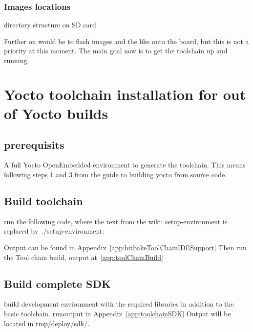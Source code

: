 \documentclass[10pt]{article}
\begin{document}
\subsubsection{Images locations}
directory structure on SD card


Further on would be to flash images and the like onto the board, but this is not a priority at this moment.
The main goal now is to get the toolchain up and running.


\section{Yocto toolchain installation for out of Yocto builds}
\subsection{prerequisits}
A full Yocto OpenEmbedded environment to generate the toolchain. This means following steps 1 and 3 from the guide to
\href{http://variwiki.com/index.php?title=Yocto\_Build\_Release&release=RELEASE\_SUMO\_V1.1\_VAR-SOM-MX6}{building yocto from source code}.


\subsection{Build toolchain}%
run the following code, where the text from the wiki: setup-environment is replaced by~./setup-environment:

Output can be found in Appendix~\ref{app:bitbakeToolChainIDESupport}
Then run the Tool chain build, output at~\ref{app:toolChainBuild}

\subsection{Build complete SDK}
build development environment with the required libraries in addition to the basic toolchain.
runoutput in Appendix~\ref{app:toolchainSDK}
Output will be located in tmp/deploy/sdk/.
\end{document}
